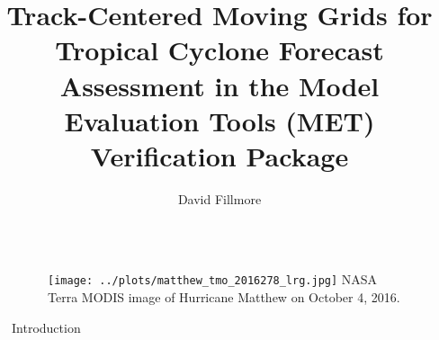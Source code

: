 \documentclass[final]{beamer}
\title{
Track-Centered Moving Grids for Tropical Cyclone Forecast Assessment
in the Model Evaluation Tools (MET) Verification Package} %
\author{David Fillmore} %
\institute{National Center for Atmospheric Research,
Research Applications Lab} %
\newlength{\sepwid}
\newlength{\onecolwid}
\begin{document}

\setlength{\belowcaptionskip}{2ex} %
\setlength\belowdisplayshortskip{2ex} %

\begin{frame}[t] %

\begin{columns}[t] %

\begin{column}{\sepwid}\end{column} %

\begin{column}{\onecolwid} %




\begin{figure}
\texttt{[image: ../plots/matthew\_tmo\_2016278\_lrg.jpg]}
\newline
{\small NASA Terra MODIS image of Hurricane Matthew on October 4, 2016.}
\end{figure}

\begin{block}{Introduction}

\end{block}



\end{column}
\end{columns}
\end{frame}
\end{document}
